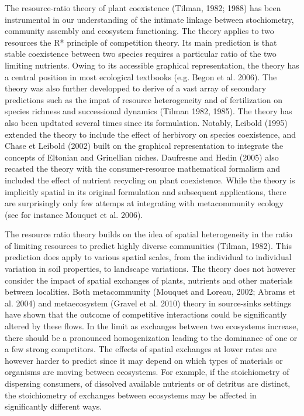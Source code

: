 \documentclass[letterpaper,twocolumn,showkeys]{revtex4-1}
\begin{document}
The resource-ratio theory of plant coexistence (Tilman, 1982; 1988) has been instrumental in our understanding of the intimate linkage between stochiometry, community assembly and ecosystem functioning. The theory applies to two resources the R* principle of competition theory. Its main prediction is that stable coexistence between two species requires a particular ratio of the two limiting nutrients. Owing to its accessible graphical representation, the theory has a central position in most ecological textbooks (e.g. Begon et al. 2006). The theory was also further developped to derive of a vast array of secondary predictions such as the impat of resource heterogeneity and of fertilization on species richness and successional dynamics (Tilman 1982, 1985). The theory has also been updtated several times since its formulation. Notably, Leibold (1995) extended the theory to include the effect of herbivory on species coexistence, and Chase et Leibold (2002) built on the graphical representation to integrate the concepts of Eltonian and Grinellian niches. Daufresne and Hedin (2005) also recasted the theory with the consumer-resource mathematical formalism and included the effect of nutrient recycling on plant coexistence. While the theory is implicitly spatial in its original formulation and subsequent applications, there are surprisingly only few attemps at integrating with metacommunity ecology (see for instance Mouquet et al. 2006).   

The resource ratio theory builds on the idea of spatial heterogeneity in the ratio of limiting resources to predict highly diverse communities (Tilman, 1982). This prediction does apply to various spatial scales, from the individual to individual variation in soil properties, to landscape variations. The theory does not however consider the impact of spatial exchanges of plants, nutrients and other materials between localities. Both metacommunity (Mouquet and Loreau, 2002; Abrams et al. 2004) and metaecosystem (Gravel et al. 2010) theory in source-sinks settings have shown that the outcome of competitive interactions could be significantly  altered by these flows. In the limit as exchanges between two ecosystems increase, there should be a pronounced homogenization leading to the dominance of one or a few strong competitors. The effects of spatial exchanges at lower rates are however harder to predict since it may depend on which types of materials or organisms are moving between ecosystems.  For example, if the stoichiometry of dispersing consumers, of dissolved available nutrients or of detritus are distinct, the stoichiometry of exchanges between ecosystems may be affected  in significantly different ways.  
\end{document}
